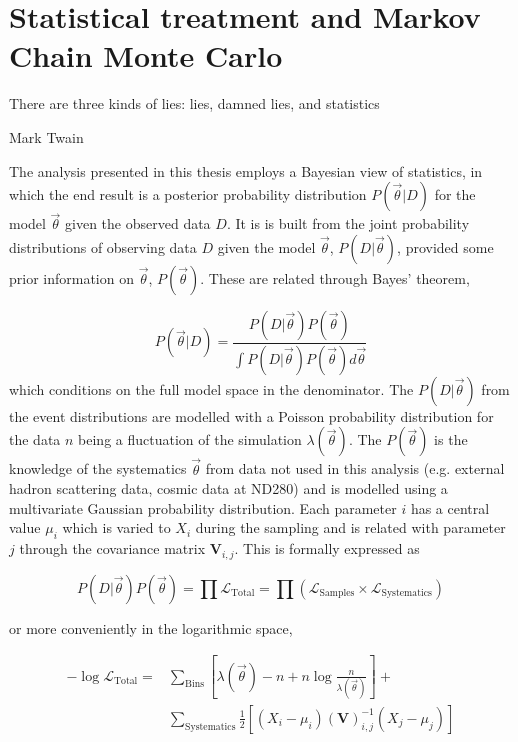 \chapter{Statistical treatment and Markov Chain Monte Carlo}
\label{chap:mcmc}

\epigraph{There are three kinds of lies: lies, damned lies, and statistics}{Mark Twain}

The analysis presented in this thesis employs a Bayesian view of statistics, in which the end result is a posterior probability distribution $P(\vec{\theta}|D)$ for the model $\vec{\theta}$ given the observed data $D$. It is is built from the joint probability distributions of observing data $D$ given the model $\vec{\theta}$, $P(D|\vec{\theta})$, provided some prior information on $\vec{\theta}$, $P(\vec{\theta})$. These are related through Bayes' theorem,

\begin{equation}
P(\vec{\theta}|D) = \frac{P(D|\vec{\theta})P(\vec{\theta})}{\int P(D|\vec{\theta})P(\vec{\theta})d\vec{\theta}}
\label{eq:bayes}
\end{equation}
which conditions on the full model space in the denominator. The $P(D|\vec{\theta})$ from the event distributions are modelled with a Poisson probability distribution for the data $n$ being a fluctuation of the simulation $\lambda(\vec{\theta})$. The $P(\vec{\theta})$ is the knowledge of the systematics $\vec{\theta}$ from data not used in this analysis (e.g. external hadron scattering data, cosmic data at ND280) and is modelled using a multivariate Gaussian probability distribution. Each parameter $i$ has a central value $\mu_i$ which is varied to $X_i$ during the sampling and is related with parameter $j$ through the covariance matrix $\mathbf{V}_{i,j}$. This is formally expressed as

\begin{equation}
	P(D|\vec{\theta}) P(\vec{\theta}) = \prod \mathcal{L}_\text{Total} = \prod \left(\mathcal{L}_\text{Samples} \times \mathcal{L}_\text{Systematics}\right)
\end{equation}

or more conveniently in the logarithmic space,

\begin{equation}
\label{eq:test_stat}
\begin{split}
	- \log\mathcal{L}_\text{Total} = &\sum_\text{Bins} \left[ \lambda(\vec{\theta}) - n + n \log \frac{n}{\lambda(\vec{\theta})} \right] + \\
									& \sum_\text{Systematics} \frac{1}{2} \left[ ( X_i - \mu_i ) \left( \boldsymbol{V} \right)^{-1}_{i,j} ( X_j - \mu_j ) \right]
\end{split}
\end{equation}


